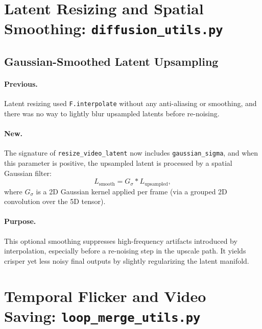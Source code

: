 \documentclass[11pt,a4paper]{article}
\newcommand{\file}[1]{\texttt{#1}}
\newcommand{\fn}[1]{\texttt{#1}}
\begin{document}
\section{Latent Resizing and Spatial Smoothing: \file{diffusion\_utils.py}}

\subsection{Gaussian-Smoothed Latent Upsampling}

\paragraph{Previous.}
Latent resizing used \fn{F.interpolate} without any anti-aliasing or smoothing,
and there was no way to lightly blur upsampled latents before re-noising.

\paragraph{New.}
The signature of \fn{resize\_video\_latent} now includes \fn{gaussian\_sigma}, and when this parameter is positive,
the upsampled latent is processed by a spatial Gaussian filter:
\begin{equation}
    L_\text{smooth} = G_\sigma * L_\text{upsampled},
\end{equation}
where \(G_\sigma\) is a 2D Gaussian kernel applied per frame (via a grouped 2D convolution over the 5D tensor).

\paragraph{Purpose.}
This optional smoothing suppresses high-frequency artifacts introduced by interpolation,
especially before a re-noising step in the upscale path.
It yields crisper yet less noisy final outputs by slightly regularizing the latent manifold.

\section{Temporal Flicker and Video Saving: \file{loop\_merge\_utils.py}}
\end{document}
